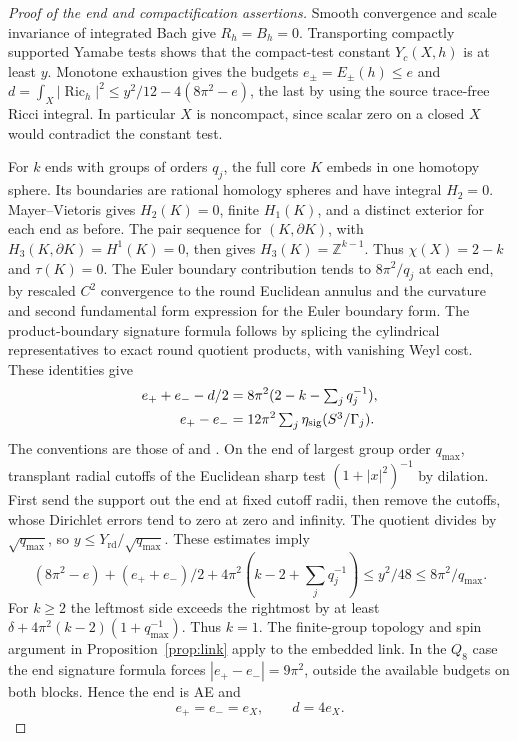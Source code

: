 \documentclass[11pt]{article}
\numberwithin{equation}{section}
\theoremstyle{definition}
\theoremstyle{remark}
\newcommand{\Ric}{\operatorname{Ric}}
\newcommand{\Yrd}{Y_{\mathrm{rd}}}
\begin{document}
\begin{proof}[Proof of the end and compactification assertions]
Smooth convergence and scale invariance of integrated Bach
give \(R_h=B_h=0\). Transporting compactly supported Yamabe
tests shows that the compact-test constant \(Y_c(X,h)\) is at
least \(y\). Monotone exhaustion gives the budgets
\(e_\pm=E_\pm(h)\le e\) and
\(d=\int_X|\Ric_h|^2\le y^2/12-4(8\pi^2-e)\), the last by
using the source trace-free Ricci integral. In particular \(X\)
is noncompact, since scalar zero on a closed \(X\) would
contradict the constant test.

For \(k\) ends with groups of orders \(q_j\), the full core
\(K\) embeds in one homotopy sphere. Its boundaries are rational
homology spheres and have integral \(H_2=0\).
Mayer--Vietoris gives \(H_2(K)=0\), finite \(H_1(K)\), and a
distinct exterior for each end as before. The pair sequence
for \((K,\partial K)\), with \(H_3(K,\partial K)=H^1(K)=0\),
then gives \(H_3(K)=\mathbb Z^{k-1}\). Thus \(\chi(X)=2-k\)
and \(\tau(K)=0\). The Euler boundary contribution tends to
\(8\pi^2/q_j\) at each end, by rescaled \(C^2\) convergence
to the round Euclidean annulus and the curvature and second
fundamental form expression for the Euler boundary form.
The product-boundary signature formula follows by splicing
the cylindrical representatives to exact round quotient
products, with vanishing Weyl cost. These identities give
\begin{align*}
 e_++e_- -d/2 &= 8\pi^2(2-k-\textstyle\sum_j q_j^{-1}),\\
 e_+-e_- &= 12\pi^2\textstyle\sum_j\eta_{\rm sig}(S^3/\Gamma_j).
\end{align*}
The conventions are those of \cite[\S7, (7.2)]{TianViaclovsky2005ALE}
and \cite[Theorem (4.14)]{APS1975SpectralI}.
On the end of largest group order \(q_{\max}\), transplant
radial cutoffs of the Euclidean sharp test
\((1+|x|^2)^{-1}\) by dilation. First send the support out
the end at fixed cutoff radii, then remove the cutoffs, whose
Dirichlet errors tend to zero at zero and infinity.
The quotient divides by \(\sqrt{q_{\max}}\), so
\(y\le\Yrd/\sqrt{q_{\max}}\).
These estimates imply
\[
 (8\pi^2-e)+(e_++e_-)/2+4\pi^2(k-2+\textstyle\sum_jq_j^{-1})
 \le y^2/48\le 8\pi^2/q_{\max}.
\]
For \(k\ge2\) the leftmost side exceeds the rightmost by
at least \(\delta+4\pi^2(k-2)(1+q_{\max}^{-1})\).
Thus \(k=1\). The finite-group topology and spin argument in
Proposition~\ref{prop:link} apply to the embedded link. In the
\(Q_8\) case the end signature formula forces
\(|e_+-e_-|=9\pi^2\), outside the available budgets on both
blocks. Hence the end is AE and
\begin{equation}\label{eq:AEenergy}
 e_+=e_-=e_X,\qquad d=4e_X .
\end{equation}


\end{proof}
\end{document}
